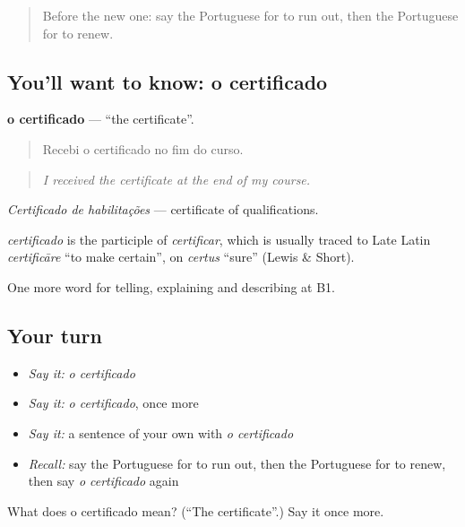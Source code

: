 \label{lesson:PT-C384-certificado}



\begin{quote}
Before the new one: say the Portuguese for to run out, then the Portuguese for to renew.
\end{quote}

\subsection*{You'll want to know: o certificado}
\textbf{o certificado} — \textquotedblleft{}the certificate\textquotedblright{}.

\begin{quote}
Recebi o certificado no fim do curso.
\end{quote}

\begin{quote}
\emph{I received the certificate at the end of my course.}
\end{quote}

\emph{Certificado de habilitações} — certificate of qualifications.

\begin{cousinweb}
\emph{certificado} is the participle of \emph{certificar}, which is usually traced to Late Latin \emph{certificāre} \textquotedblleft{}to make certain\textquotedblright{}, on \emph{certus} \textquotedblleft{}sure\textquotedblright{} (Lewis \& Short).
\end{cousinweb}

\begin{grammarlens}[title={What you've built}]
One more word for telling, explaining and describing at B1.
\end{grammarlens}

\subsection*{Your turn}
\begin{itemize}
\raggedright
  \item \emph{Say it:} \emph{o certificado}
  \item \emph{Say it:} \emph{o certificado}, once more
  \item \emph{Say it:} a sentence of your own with \emph{o certificado}
  \item \emph{Recall:} say the Portuguese for to run out, then the Portuguese for to renew, then say \emph{o certificado} again
\end{itemize}

\begin{tcolorbox}[breakable,colback=teal!4,colframe=teal!35!black,title={Before you move on}]
What does o certificado mean? (\textquotedblleft{}The certificate\textquotedblright{}.) Say it once more.
\end{tcolorbox}
